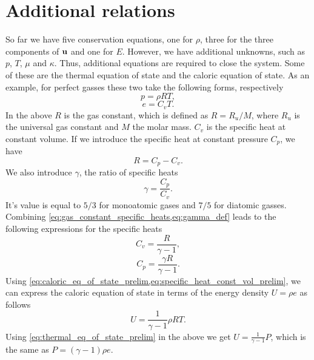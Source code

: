 \documentclass[oneside,a4paper,11pt]{report}
\begin{document}
\section{Additional relations}
So far we have five conservation equations, one for $\rho$, three for the three components of $\mathbf{u}$ and one for $E$. However, we have additional unknowns, such as $p$, $T$, $\mu$ and $\kappa$. Thus, additional equations are required to close the system. Some of these are the thermal equation of state and the caloric equation of state. As an example, for perfect gasses these two take the following forms, respectively
\begin{equation}
\label{eq:thermal_eq_of_state_prelim}
    p = \rho R T,
\end{equation}
\begin{equation}
\label{eq:caloric_eq_of_state_prelim}
    e = C_v T.
\end{equation}
In the above $R$ is the gas constant, which is defined as $R = R_u / M$, where $R_u$ is the universal gas constant and $M$ the molar mass. $C_v$ is the specific heat at constant volume. If we introduce the specific heat at constant pressure $C_p$, we have 
\begin{equation}
\label{eq:gas_constant_specific_heats}
    R = C_p - C_v.
\end{equation}
We also introduce $\gamma$, the ratio of specific heats
\begin{equation}
\label{eq:gamma_def}
    \gamma = \frac{C_p}{C_v}.
\end{equation}
It's value is equal to $5/3$ for monoatomic gases and $7/5$ for diatomic gasses. Combining \cref{eq:gas_constant_specific_heats,eq:gamma_def} leads to the following expressions for the specific heats 
\begin{equation}
\label{eq:specific_heat_const_vol_prelim}
    C_v = \frac{R}{\gamma - 1},
\end{equation}
\begin{equation}
    \label{eq:specific_heat_const_press_prelim}
    C_p = \frac{\gamma R}{\gamma - 1}.
\end{equation}
Using \cref{eq:caloric_eq_of_state_prelim,eq:specific_heat_const_vol_prelim}, we can express the caloric equation of state in terms of the energy density $U = \rho e$ as follows
\begin{equation}
    U = \frac{1}{\gamma - 1} \rho R T.
\end{equation}
Using \cref{eq:thermal_eq_of_state_prelim} in the above we get $U = \frac{1}{\gamma - 1} P$, which is the same as $P = (\gamma -1) \rho  e$.
\end{document}

